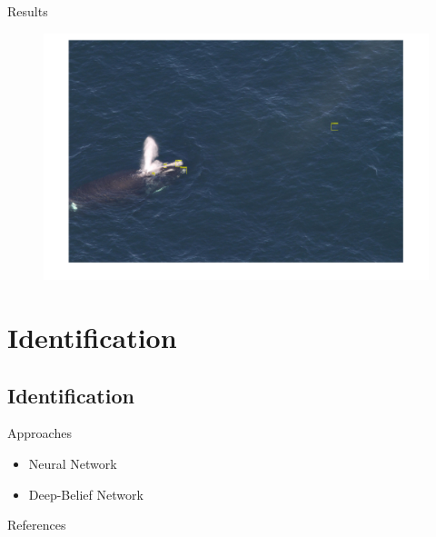 \documentclass{beamer}
\begin{document}
\begin{frame}{Results}
\begin{figure}
\includegraphics[scale=.25]{recog.png}
\end{figure}
\end{frame}

\section{Identification}
\subsection{Identification}
\begin{frame}{Approaches}
\begin{itemize}
\item Neural Network
\item Deep-Belief Network
\end{itemize}
\end{frame}

\begin{frame}{References}

\nocite{*}
\end{frame}
\end{document}

